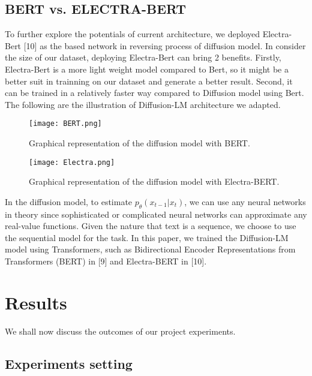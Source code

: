 \documentclass{article}
\begin{document}
\subsection{BERT vs. ELECTRA-BERT} 
To further explore the potentials of current architecture, we deployed Electra-Bert [10] as the based network in reversing process of diffusion model. In consider the size of our dataset, deploying Electra-Bert can bring 2 benefits. Firstly, Electra-Bert is a more light weight model compared to Bert, so it might be a better suit in trainning on our dataset and generate a better result. Second, it can be trained in a relatively faster way compared to Diffusion model using Bert. The following are the illustration of Diffusion-LM architecture we adapted. 

\begin{figure}[!htb]
   \begin{minipage}{1\textwidth}
     \centering
     \texttt{[image: BERT.png]}
     \caption{Graphical representation of the diffusion model with BERT.}\label{Fig:Data1}
   \end{minipage}\hfill
\end{figure}

\begin{figure}[!htb]
   \begin{minipage}{1\textwidth}
     \centering
     \texttt{[image: Electra.png]}
     \caption{Graphical representation of the diffusion model with Electra-BERT.}\label{Fig:Data1}
   \end{minipage}\hfill
\end{figure}

In the diffusion model, to estimate $p_{\theta}(x_{t-1}|x_t)$, we can use any neural networks in theory since sophisticated or complicated neural networks can approximate any real-value functions. Given the nature that text is a sequence, we choose to use the sequential model for the task. In this paper, we trained the Diffusion-LM model using Transformers, such as Bidirectional Encoder Representations from Transformers (BERT) in [9] and Electra-BERT in [10].


\section{Results}

We shall now discuss the outcomes of our project experiments.

\subsection{Experiments setting}
\end{document}

